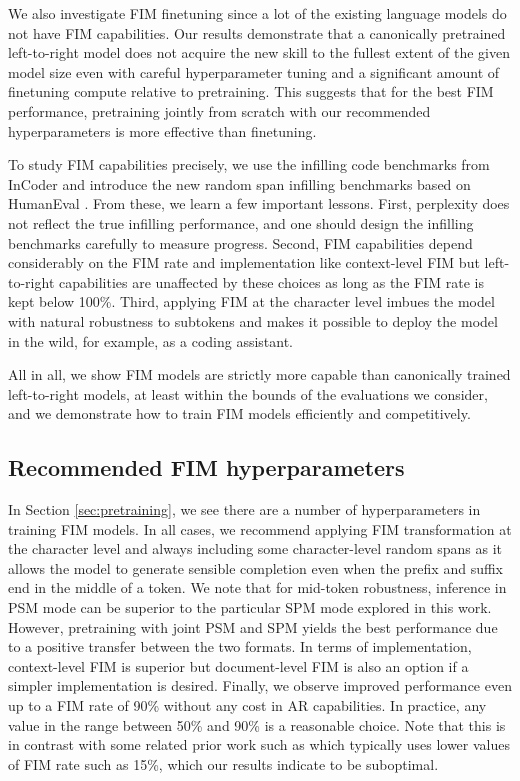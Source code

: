 \documentclass[postscript]{article}
\begin{document}
We also investigate FIM finetuning since a lot of the existing language models do not have FIM capabilities. Our results demonstrate that a canonically pretrained left-to-right model does not acquire the new skill to the fullest extent of the given model size even with careful hyperparameter tuning and a significant amount of finetuning compute relative to pretraining. This suggests that for the best FIM performance, pretraining jointly from scratch with our recommended hyperparameters is more effective than finetuning.

To study FIM capabilities precisely, we use the infilling code benchmarks from InCoder \citep{incoder} and introduce the new random span infilling benchmarks based on HumanEval \citep{codex}. From these, we learn a few important lessons.
First, perplexity does not reflect the true infilling performance, and one should design the infilling benchmarks carefully to measure progress. Second, FIM capabilities depend considerably on the FIM rate and implementation like context-level FIM but left-to-right capabilities are unaffected by these choices as long as the FIM rate is kept below 100\%. Third, applying FIM at the character level imbues the model with natural robustness to subtokens and makes it possible to deploy the model in the wild, for example, as a coding assistant. 

All in all, we show FIM models are strictly more capable than canonically trained left-to-right models, at least within the bounds of the evaluations we consider, and we demonstrate how to train FIM models efficiently and competitively.


\subsection{Recommended FIM hyperparameters}
\label{sec:conclusion:recommendation}

In Section \ref{sec:pretraining}, we see there are a number of hyperparameters in training FIM models. In all cases, we recommend applying FIM transformation at the character level and always including some character-level random spans as it allows the model to generate sensible completion even when the prefix and suffix end in the middle of a token. We note that for mid-token robustness, inference in PSM mode can be superior to the particular SPM mode explored in this work. However, pretraining with joint PSM and SPM yields the best performance due to a positive transfer between the two formats. In terms of implementation, context-level FIM is superior but document-level FIM is also an option if a simpler implementation is desired. Finally, we observe improved performance even up to a FIM rate of 90\% without any cost in AR capabilities. In practice, any value in the range between 50\% and 90\% is a reasonable choice. Note that this is in contrast with some related prior work such as \citep{incoder} which typically uses lower values of FIM rate such as 15\%, which our results indicate to be suboptimal.
\end{document}
